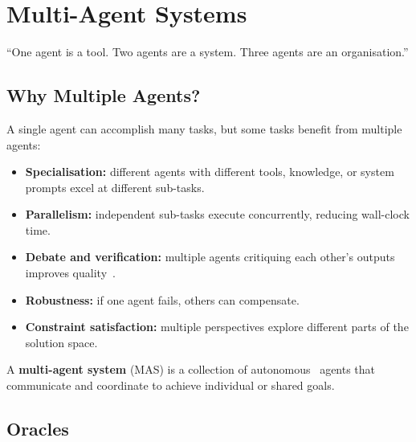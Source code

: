 \chapter{Multi-Agent Systems}
\label{ch:multi-agent}

\epigraph{``One agent is a tool. Two agents are a system. Three agents are an organisation.''}{}


\section{Why Multiple Agents?}

A single agent can accomplish many tasks, but some tasks benefit from multiple agents:

\begin{itemize}
	\item \textbf{Specialisation:} different agents with different tools, knowledge, or system prompts excel at different sub-tasks.
	\item \textbf{Parallelism:} independent sub-tasks execute concurrently, reducing wall-clock time.
	\item \textbf{Debate and verification:} multiple agents critiquing each other's outputs improves quality~\cite{li2023camel}.
	\item \textbf{Robustness:} if one agent fails, others can compensate.
	\item \textbf{Constraint satisfaction:} multiple perspectives explore different parts of the solution space.
\end{itemize}

\begin{definition}
	A \textbf{multi-agent system} (MAS) is a collection of autonomous \llm\ agents that communicate and coordinate to achieve individual or shared goals.
\end{definition}

\section{Oracles}

